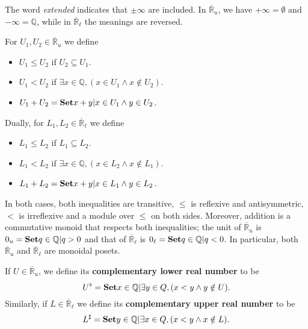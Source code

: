 \documentclass{article}
\def\Q{\mathbb{Q}}
\def\R{\mathbb{R}}
\def\Re{\overline{\R}}
\def\Reu{\Re_u}
\def\Rel{\Re_{\ell}}
\def\upp#1{{#1}^{\sharp}}
\def\low#1{{#1}^{\flat}}
\begin{document}
The word \emph{extended} indicates that $\pm\infty$ are included.
In $\Reu$, we have $+\infty = \emptyset$ and $-\infty = \Q$, while in $\Rel$ the meanings are reversed.

For $U_1,U_2\in \Reu$ we define
\begin{itemize}
\item $U_1 \le U_2$ if $U_2\subseteq U_1$.
\item $U_1 < U_2$ if $\exists x\in \Q, (x\in U_1 \land x\notin U_2)$.
\item $U_1 + U_2 = \setof{x+y | x\in U_1 \land y\in U_2}$.
\end{itemize}
Dually, for $L_1,L_2 \in\Rel$ we define
\begin{itemize}
\item $L_1 \le L_2$ if $L_1\subseteq L_2$.
\item $L_1 < L_2$ if $\exists x\in \Q, (x\in L_2 \land x\notin L_1)$.
\item $L_1 + L_2 = \setof{x+y | x\in L_1 \land y\in L_2}$.
\end{itemize}
In both cases, both inequalities are transitive, $\le$ is reflexive and antisymmetric, $<$ is irreflexive and a module over $\le$ on both sides.
Moreover, addition is a commutative monoid that respects both inequalities; the unit of $\Reu$ is $0_u = \setof{q\in \Q | q > 0}$ and that of $\Rel$ is $0_\ell = \setof{q\in \Q | q < 0}$.
In particular, both $\Reu$ and $\Rel$ are monoidal posets.

If $U\in\Reu$, we define its \textbf{complementary lower real number} to be
\[ \low U = \setof{x\in\Q | \exists y\in Q, (x<y \land y\notin U)}. \]
Similarly, if $L\in\Rel$ we define its \textbf{complementary upper real number} to be
\[ \upp L = \setof{y\in\Q | \exists x\in Q, (x<y \land x\notin L)}. \]
\end{document}
